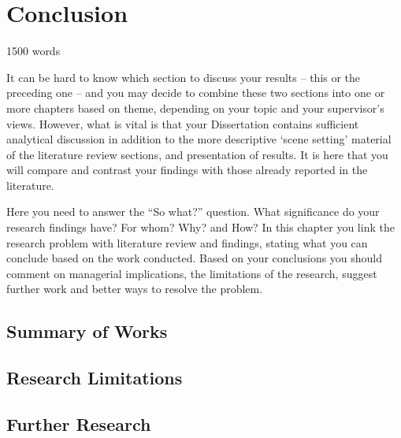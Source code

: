 \chapter{Conclusion}\label{ch:conclusion}

1500 words

It can be hard to know which section to discuss your results – this or the preceding one – and you may decide to combine
these two sections into one or more chapters based on theme, depending on your topic and your supervisor’s views.
However, what is vital is that your Dissertation contains sufficient analytical discussion in addition to the more descriptive ‘scene setting’
material of the literature review sections, and presentation of results.
It is here that you will compare and contrast your findings with those already reported in the literature.

Here you need to answer the “So what?” question.
What significance do your research findings have?
For whom?
Why?
and How?
In this chapter you link the research problem with literature review and findings, stating what you can conclude based on the work conducted.
Based on your conclusions you should comment on managerial implications, the limitations of the research, suggest further work and better ways to resolve the problem.

\section{Summary of Works}\label{sec:Summary of Works}


\section{Research Limitations}\label{sec:Research Limitations}


\section{Further Research}\label{sec:Further Research}
